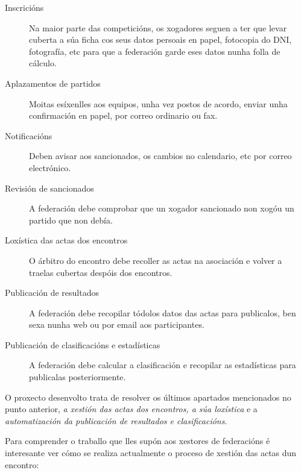     \begin{description}
     \item [Inscricións] Na maior parte das competicións, os xogadores seguen a ter que 
levar cuberta a súa ficha cos seus datos persoais en papel, fotocopia do DNI, fotografía, 
etc para que a federación garde eses datos nunha folla de cálculo.
     \item [Aplazamentos de partidos] Moitas esíxenlles aos equipos, unha vez postos de 
acordo, enviar unha confirmación en papel, por correo ordinario ou fax.
     \item [Notificacións] Deben avisar aos sancionados, os cambios no calendario, etc 
por correo electrónico.
     \item [Revisión de sancionados] A federación debe comprobar que un xogador 
sancionado non xogóu un partido que non debía.
     \item [Loxística das actas dos encontros] O árbitro do encontro debe recoller as 
actas na asociación e volver a traelas cubertas despóis dos encontros.
     \item [Publicación de resultados] A federación debe recopilar tódolos datos das 
actas para publicalos, ben sexa nunha web ou por email aos participantes.
     \item [Publicación de clasificacións e estadísticas] A federación debe calcular a 
clasificación e recopilar as estadísticas para publicalas posteriormente.
    \end{description}

    O proxecto desenvolto trata de resolver os últimos apartados mencionados no 
punto anterior, \emph{a xestión das actas dos encontros, a súa loxística} e a 
\emph{automatización da publicación de resultados e clasificacións}.

    Para comprender o traballo que lles supón aos xestores de 
federacións é interesante ver cómo se realiza actualmente o proceso de xestión 
das actas dun encontro:

